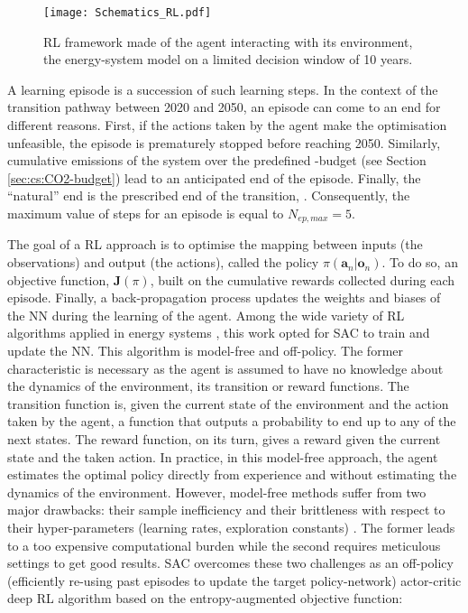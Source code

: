 \begin{figure}[!htbp]
\centering
\texttt{[image: Schematics\_RL.pdf]}
\caption{\Acrfull{RL} framework made of the agent interacting with its environment, \ie the energy-system model on a limited decision window of 10 years.}
\label{fig:Schematics_RL}
\end{figure}

A learning episode is a succession of such learning steps. In the context of the transition pathway between 2020 and 2050, an episode can come to an end for different reasons. First, if the actions taken by the agent make the optimisation unfeasible, the episode is prematurely stopped before reaching 2050. Similarly, cumulative emissions of the system over the predefined -budget (see Section \ref{sec:cs:CO2-budget}) lead to an anticipated end of the episode. Finally, the ``natural'' end is the prescribed end of the transition, . Consequently, the maximum value of steps for an episode is equal to $N_{ep,max}=5$. 

The goal of a \gls{RL} approach is to optimise the mapping between inputs (\ie the observations) and output (\ie the actions), called the policy $\pi\left(\bm{a}_n | \bm{o}_n\right)$. To do so, an objective function, $\bm{J}(\pi)$, built on the cumulative rewards collected during each episode. Finally, a back-propagation process updates the weights and biases of the \gls{NN} during the learning of the agent. Among the wide variety of \gls{RL} algorithms applied in energy systems \cite{perera2021applications}, this work opted for \gls{SAC} \cite{haarnoja2018soft} to train and update the \gls{NN}. This algorithm is model-free and off-policy. The former characteristic is necessary as the agent is assumed to have no knowledge about the dynamics of the environment, \ie its transition or reward functions. The transition function is, given the current state of the environment and the action taken by the agent, a function that outputs a probability to end up to any of the next states. The reward function, on its turn, gives a reward given the current state and the taken action. In practice, in this model-free approach, the agent estimates the optimal policy directly from experience and without estimating the dynamics of the environment. However, model-free methods suffer from two major drawbacks: their sample inefficiency and their brittleness with respect to their hyper-parameters (\eg learning rates, exploration constants) \cite{haarnoja2018soft}. The former leads to a too expensive computational burden while the second requires meticulous settings to get good results. \gls{SAC} overcomes these two challenges as an off-policy (\ie efficiently re-using past episodes to update the target policy-network) actor-critic deep \gls{RL} algorithm based on the entropy-augmented objective function: 

